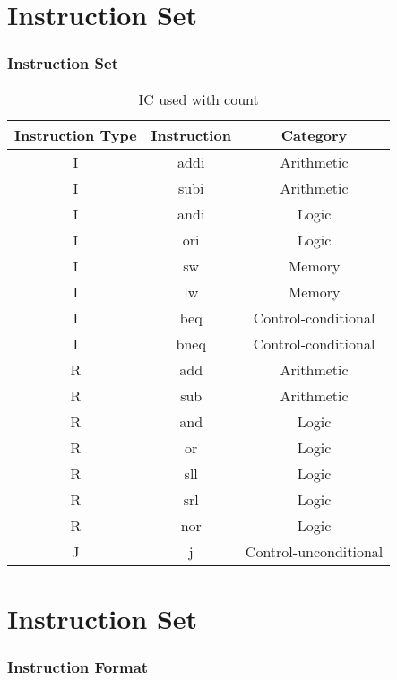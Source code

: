 \documentclass[8pt, light]{oist_presentation}
\begin{document}
\section{Instruction Set}
\begin{frame}
\frametitle{Instruction Set}
\begin{table}
\begin{tabular}{| c || c || c |}
\hline
\textbf{Instruction Type} & \textbf{Instruction} & \textbf{Category}\\
\hline
I & addi & Arithmetic \\
\hline
I & subi & Arithmetic \\
\hline
I & andi & Logic \\
\hline
I & ori & Logic \\
\hline
I & sw & Memory \\
\hline
I & lw & Memory \\
\hline
I & beq & Control-conditional \\
\hline
I & bneq & Control-conditional \\
\hline
R & add & Arithmetic \\
\hline
R & sub & Arithmetic \\
\hline
R & and & Logic \\
\hline
R & or & Logic \\
\hline
R & sll & Logic \\
\hline
R & srl & Logic \\
\hline
R & nor & Logic \\
\hline
J & j & Control-unconditional \\
\hline
\end{tabular}
\caption{IC used with count}
\end{table}
\end{frame}

\section{Instruction Set}
\begin{frame}
\frametitle{Instruction Format}
\begin{table}
\begin{tabular}{c  | c || c || c |}


\end{tabular}
\end{table}

\end{frame}
\end{document}
